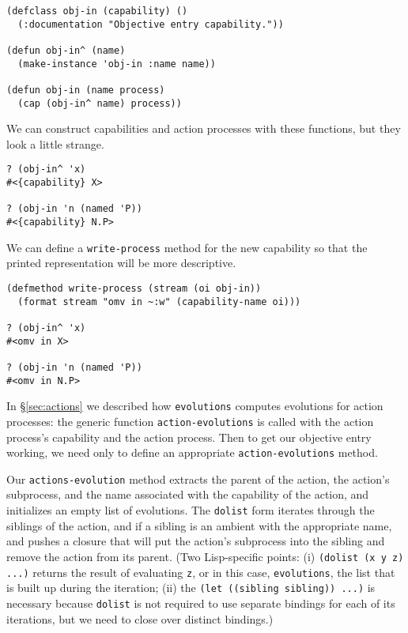 \documentclass[12pt]{article}
\begin{document}
\begin{verbatim}
(defclass obj-in (capability) ()
  (:documentation "Objective entry capability."))

(defun obj-in^ (name)
  (make-instance 'obj-in :name name))

(defun obj-in (name process)
  (cap (obj-in^ name) process))
\end{verbatim}

We can construct capabilities and action processes with these functions, but they look a little strange.

\begin{verbatim}
? (obj-in^ 'x)
#<{capability} X>

? (obj-in 'n (named 'P))
#<{capability} N.P>
\end{verbatim}

We can define a \texttt{write-process} method for the new capability so that the printed representation will be more descriptive.

\begin{verbatim}
(defmethod write-process (stream (oi obj-in))
  (format stream "omv in ~:w" (capability-name oi)))

? (obj-in^ 'x)
#<omv in X>

? (obj-in 'n (named 'P))
#<omv in N.P>
\end{verbatim}

In \S\ref{sec:actions} we described how \texttt{evolutions} computes evolutions for action processes:
the generic function \texttt{action-evolutions} is called with the action process's capability and the action process.
Then to get our objective entry working, we need only to define an appropriate \texttt{action-evolutions} method.

Our \texttt{actions-evolution} method extracts the parent of the action, the action's subprocess, and the name associated with the capability of the action, and initializes an empty list of evolutions.
The \texttt{dolist} form iterates through the siblings of the action, and if a sibling is an ambient with the appropriate name, and pushes a closure that will put the action's subprocess into the sibling and remove the action from its parent.
(Two Lisp-specific points:
(i) \texttt{(dolist (x y z) ...)} returns the result of evaluating \texttt{z}, or in this case, \texttt{evolutions}, the list that is built up during the iteration;
(ii) the \texttt{(let ((sibling sibling)) ...)} is necessary because \texttt{dolist} is not required to use separate bindings for each of its iterations, but we need to close over distinct bindings.)
\end{document}
